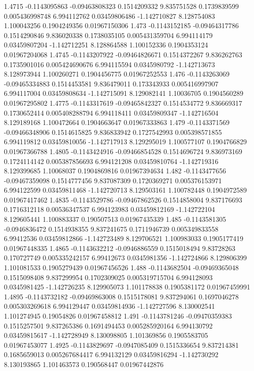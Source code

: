 {1.4715 -0.1143095863 -0.09463808323 0.1514209332 9.835751528 0.1739839599 0.005436998748 6.994112762 0.03459806486 -1.142710827 8.128754083 1.100043256 0.1904249356 0.01967150306
1.473 -0.1143152185 -0.09464317786 0.1514290846 9.836020338 0.1738035105 0.005431359704 6.994114179 0.03459807204 -1.142712251 8.128864588 1.100152336 0.1904353124 0.01967204068
1.4745 -0.1143207922 -0.09464826671 0.1514372267 9.836262763 0.1735901016 0.005424690676 6.994115594 0.0345980792 -1.142713673 8.128973944 1.100260271 0.1904456775 0.01967252553
1.476 -0.1143263069 -0.09465334883 0.1514453581 9.836479011 0.173343933 0.005416997907 6.994117004 0.03459808634 -1.142715091 8.129082141 1.10036705 0.1904560289 0.01967295802
1.4775 -0.1143317619 -0.09465842327 0.1514534772 9.836669317 0.1730652414 0.005408288794 6.994118411 0.03459809347 -1.142716504 8.129189168 1.100472664 0.1904663647 0.01967333863
1.479 -0.1143371569 -0.09466348906 0.1514615825 9.836833942 0.1727542993 0.005398571855 6.994119812 0.03459810056 -1.142717913 8.129295019 1.100577107 0.1904766829 0.01967366788
1.4805 -0.1143424916 -0.09466854528 0.1514696724 9.836973169 0.1724114142 0.005387856693 6.994121208 0.03459810764 -1.142719316 8.129399685 1.10068037 0.1904869816 0.01967394634
1.482 -0.1143477656 -0.09467359098 0.1514777456 9.837087309 0.1720369271 0.005376153971 6.994122599 0.03459811468 -1.142720713 8.129503161 1.100782448 0.1904972589 0.01967417462
1.4835 -0.1143529786 -0.09467862526 0.1514858004 9.837176693 0.1716312118 0.00536347537 6.994123983 0.03459812169 -1.142722104 8.129605441 1.100883337 0.190507513 0.01967435339
1.485 -0.1143581305 -0.0946836472 0.1514938355 9.837241675 0.1711946739 0.005349833558 6.99412536 0.03459812866 -1.142723489 8.129706521 1.100983033 0.1905177419 0.01967448335
1.4865 -0.1143632212 -0.0946886559 0.1515018494 9.83728263 0.170727749 0.005335242157 6.99412673 0.0345981356 -1.142724866 8.129806399 1.101081533 0.1905279439 0.01967456526
1.488 -0.1143682504 -0.09469365048 0.1515098408 9.837299954 0.1702309025 0.005319715704 6.994128093 0.0345981425 -1.142726235 8.129905073 1.101178838 0.1905381172 0.01967459991
1.4895 -0.1143732182 -0.09469863008 0.1515178081 9.837294061 0.1697046278 0.005303269618 6.994129447 0.03459814936 -1.142727596 8.130002541 1.101274945 0.19054826 0.01967458812
1.491 -0.1143781246 -0.09470359383 0.1515257501 9.837265386 0.1691494453 0.005285920164 6.994130792 0.03459815617 -1.142728949 8.130098805 1.101369856 0.1905583705 0.01967453077
1.4925 -0.1143829697 -0.0947085409 0.1515336654 9.837214381 0.1685659013 0.005267684417 6.994132129 0.03459816294 -1.142730292 8.130193865 1.101463573 0.190568447 0.01967442876
}
